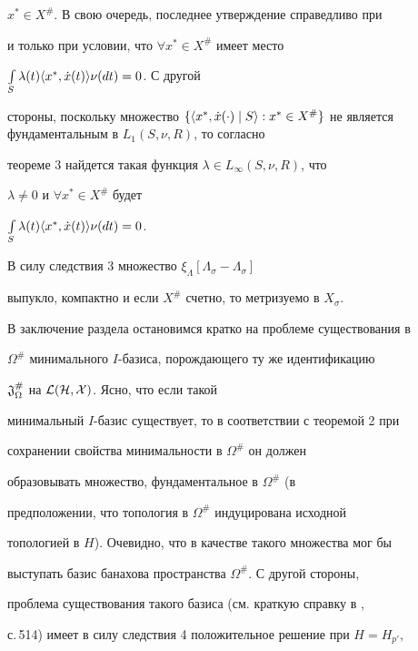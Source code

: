 $x^*\in X^{\#}$. В свою очередь, последнее утверждение справедливо при 


и только при условии, что $\forall x^*\in X^{\#}$ имеет место 


$\int\limits_S\lambda(t)\langle x^*,\Dot x(t)\rangle\nu(dt)=0$. С другой 


стороны, поскольку множество $\{\la x^*,\Dot x(\cdot)\mid S\ra:x^*\in 


X^{\#}\}$ не является фундаментальным в $L_1(S,\nu,R)$, то согласно 


теореме 3 найдется такая функция $\lambda\in L_\infty(S,\nu,R)$, что 


$\lambda\ne0$ и $\forall x^*\in X^{\#}$ будет 


$\int\limits_S\lambda(t)\langle x^*,\Dot x(t)\rangle\nu(dt)=0$. 


 


\begin{cor} 


В силу следствия 3 множество $\xi_\Lambda[\Lambda_\sigma-\Lambda_\sigma]$ 


выпукло, компактно и если $X^{\#}$ счетно, то метризуемо в $X_\sigma$. 


\end{cor} 


 


В заключение раздела остановимся кратко на проблеме существования в 


$\Omega^{\#}$ минимального $I$-базиса, порождающего ту же идентификацию 


$\frak J^{\#}_\Omega$ на $\cal L(H,X)$. Ясно, что если такой 


минимальный $I$-базис существует, то в соответствии с теоремой 2 при 


сохранении свойства минимальности в $\Omega^{\#}$ он должен 


образовывать множество, фундаментальное в $\Omega^{\#}$ (в 


предположении, что топология в $\Omega^{\#}$ индуцирована исходной 


топологией в $H$). Очевидно, что в качестве такого множества мог бы 


выступать базис банахова пространства $\Omega^{\#}$. С другой стороны, 


проблема существования такого базиса (см. краткую справку в \cite{13}, 


с.\,514) имеет в силу следствия 4 положительное решение при $H=H_{p'}$, 


